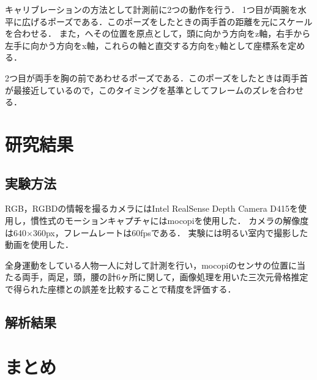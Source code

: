 \documentclass[titlepage]{jarticle}
\begin{document}
キャリブレーションの方法として計測前に2つの動作を行う．
1つ目が両腕を水平に広げるポーズである．このポーズをしたときの両手首の距離を元にスケールを合わせる．
また，へその位置を原点として，頭に向かう方向をz軸，右手から左手に向かう方向をx軸，これらの軸と直交する方向をy軸として座標系を定める．

2つ目が両手を胸の前であわせるポーズである．このポーズをしたときは両手首が最接近しているので，このタイミングを基準としてフレームのズレを合わせる．
\section{研究結果}
\subsection{実験方法}
RGB，RGBDの情報を撮るカメラにはIntel RealSense Depth Camera D415を使用し，慣性式のモーションキャプチャにはmocopiを使用した．
カメラの解像度は640$\times$360px，フレームレートは60fpsである．
実験には明るい室内で撮影した動画を使用した．

全身運動をしている人物一人に対して計測を行い，mocopiのセンサの位置に当たる両手，両足，頭，腰の計6ヶ所に関して，画像処理を用いた三次元骨格推定で得られた座標との誤差を比較することで精度を評価する．
\subsection{解析結果}



\section{まとめ}

\begin{thebibliography}{99}
  \small{




  }
\end{thebibliography}
\end{document}
